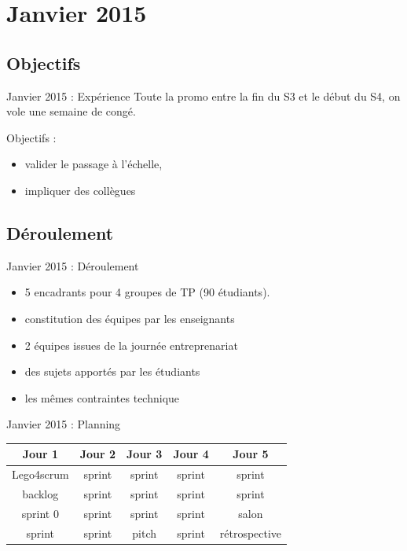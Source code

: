 \documentclass{beamer}
\begin{document}
\section{Janvier 2015}
\subsection{Objectifs}
\begin{frame}{Janvier 2015 : Expérience}
  Toute la promo entre la fin du S3 et le début du S4, on vole une semaine de congé.

  Objectifs : 
  \begin{itemize}
    \item valider le passage à l'échelle, 
    \item impliquer des collègues
  \end{itemize}
\end{frame}

\subsection{Déroulement}
\begin{frame}{Janvier 2015 : Déroulement}
  \begin{itemize}
    \item 5 encadrants pour 4 groupes de TP (90 étudiants).
    \item constitution des équipes par les enseignants
    \item 2 équipes issues de la journée entreprenariat
    \item des sujets apportés par les étudiants
    \item les mêmes contraintes technique
  \end{itemize}
\end{frame}

\begin{frame}{Janvier 2015 : Planning}
  \begin{center}
    \begin{tabular}{| c | c | c | c | c |}
      \hline
      \textbf{Jour 1} & \textbf{Jour 2} & \textbf{Jour 3} & \textbf{Jour 4} & \textbf{Jour 5} \\
      \hline \hline
      Lego4scrum      & sprint          & sprint          & sprint          & sprint          \\
      \hline
      backlog         & sprint          & sprint          & sprint          & sprint          \\
      \hline \hline
      sprint 0        & sprint          & sprint          & sprint          & salon           \\
      \hline
      sprint          & sprint          & pitch           & sprint          & rétrospective   \\
      \hline
    \end{tabular}
  \end{center}
\end{frame}
\end{document}
